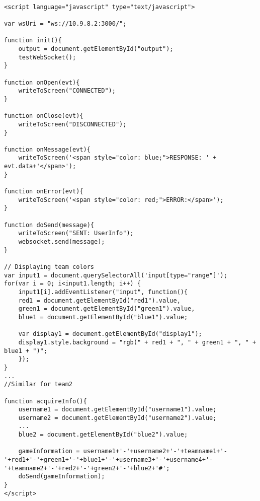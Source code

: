 \documentclass[Softwaredesign/Softwaredesign_main.tex]{subfiles}
\begin{document}
\begin{lstlisting}[caption={WebPage event handlers}, label=list:webpage_handlers]

<script language="javascript" type="text/javascript">

var wsUri = "ws://10.9.8.2:3000/";

function init(){
    output = document.getElementById("output");
    testWebSocket();
}

function onOpen(evt){
    writeToScreen("CONNECTED");
}

function onClose(evt){
    writeToScreen("DISCONNECTED");
}

function onMessage(evt){
    writeToScreen('<span style="color: blue;">RESPONSE: ' + evt.data+'</span>');
}

function onError(evt){
    writeToScreen('<span style="color: red;">ERROR:</span>');
}

function doSend(message){
    writeToScreen("SENT: UserInfo");
    websocket.send(message);
}

// Displaying team colors
var input1 = document.querySelectorAll('input[type="range"]');
for(var i = 0; i<input1.length; i++) {
    input1[i].addEventListener("input", function(){
    red1 = document.getElementById("red1").value,
    green1 = document.getElementById("green1").value,
    blue1 = document.getElementById("blue1").value;

    var display1 = document.getElementById("display1");
    display1.style.background = "rgb(" + red1 + ", " + green1 + ", " + blue1 + ")";
    });
}
...
//Similar for team2

function acquireInfo(){
    username1 = document.getElementById("username1").value;
    username2 = document.getElementById("username2").value;
    ...
    blue2 = document.getElementById("blue2").value;

    gameInformation = username1+'-'+username2+'-'+teamname1+'-'+red1+'-'+green1+'-'+blue1+'-'+username3+'-'+username4+'-'+teamname2+'-'+red2+'-'+green2+'-'+blue2+'#';
    doSend(gameInformation);
}
</script>
\end{lstlisting}
\end{document}
